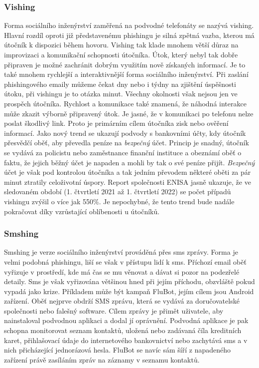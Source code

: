 \subsubsection{Vishing}
Forma sociálního inženýrství zaměřená na podvodné telefonáty se nazývá vishing.
Hlavní rozdíl oproti již představenému phishingu je silná zpětná vazba, kterou má útočník k dispozici během hovoru.
Vishing tak klade mnohem větší důraz na improvizaci a komunikační schopnosti útočníka.
Útok, který nebyl tak dobře připraven je možné zachránit dobrým využitím nově získaných informací.
Je to také mnohem rychlejší a interaktivnější forma sociálního inženýrství.
Při zaslání phishingového emaily můžeme čekat dny nebo i týdny na zjištění úspěšnosti útoku, při vishingu je to otázka minut.
Všechny okolnosti však nejsou jen ve prospěch útočníka.
Rychlost a komunikace také znamená, že náhodná interakce může zkazit výborně připravený útok.
Je jasné, že v komunikaci po telefonu nelze poslat škodlivý link.
Proto je primárním cílem útočníka zisk nebo ověření informací.
Jako nový trend se ukazují podvody s bankovními účty, kdy útočník přesvědčí oběť, aby převedla peníze na \textit{bezpečný} účet.
Princip je snadný, útočník se vydává za policistu nebo zaměstnance finanční instituce a obeznámí oběť o faktu, že jejich běžný účet je napaden a mohli by tak o své peníze přijít.
\textit{Bezpečný} účet je však pod kontrolou útočníka a tak jedním převodem některé oběti za pár minut ztratily celoživotní úspory.
Report společnosti \ac{ENISA} jasně ukazuje, že ve sledovaném období (1. čtvrtletí 2021 až 1. čtvrtletí 2022) se počet případů vishingu zvýšil o více jak 550\%.
Je nepochybné, že tento trend bude nadále pokračovat díky vzrůstající oblíbenosti u útočníků.\cite{Enisa_thread_landscape, moje_bakalarka}

\subsubsection{Smshing}
Smshing je verze sociálního inženýrství prováděná přes sms zprávy.
Forma je velmi podobná phishingu, liší se však v přístupu lidí k sms.
Příchozí email oběť vyřizuje v prostředí, kde má čas se mu věnovat a dávat si pozor na podezřelé detaily.
Sms je však vyřizována většinou hned při jejím příchodu, obzvláště pokud vypadá jako krize.
Příkladem může být kampaň FluBot, jejím cílem jsou Android zařízení.
Oběť nejprve obdrží SMS zprávu, která se vydává za doručovatelské společnosti nebo falešný software.
Cílem zprávy je přimět uživatele, aby nainstaloval podvodnou aplikaci a dodal jí oprávnění.
Podvodná aplikace je pak schopna monitorovat seznam kontaktů, uložená nebo zadávaná číla kreditních karet, přihlašovací údaje do internetového bankovnictví nebo zachytává sms a v nich přicházející jednorázová hesla.
FluBot se navíc sám šíří z napadeného zařízení právě zasíláním zpráv na záznamy v seznamu kontaktů.\cite{Enisa_thread_landscape, moje_bakalarka}

